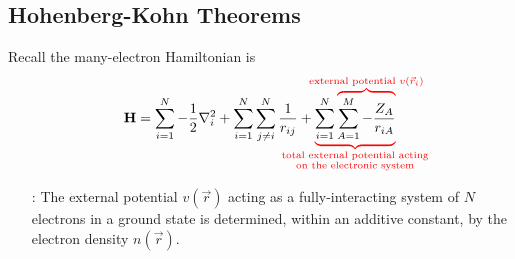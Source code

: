 \documentclass[12pt,a4paper,titlepage]{article}
\newcommand\hruleMod{%
	\vskip12pt
	\nointerlineskip
	{\color{lightgray}\leaders\vrule width \textwidth\vskip0.4pt}
	\nointerlineskip
	\vskip12pt
}
\newcommand{\aside}[3][]{ %
	\ifthenelse{\equal{#1}{}}{\hruleMod}{}
	\begin{itemize}[align=left,labelindent=0em,labelwidth=3em,labelsep*=0.5em,leftmargin=!]
		\item[\ul{#2}:]{#3}
	\end{itemize}
	\ifthenelse{\equal{#1}{}}{\hruleMod}{}
}
\newcommand{\trm}[1]{\textrm{#1}} %
\newcommand{\ul}[1]{\underline{\smash{#1}}} %
\begin{document}
\subsection{Hohenberg-Kohn Theorems}
Recall the many-electron Hamiltonian is
\begin{equation}
\vb{H}=\sum_{i=1}^{N}-\frac{1}{2}\nabla_{i}^{2}+\sum_{i=1}^{N}\sum_{j\neq i}^{N}\frac{1}{r_{ij}}+{\color{red}\underbrace{\color{black}\sum_{i=1}^{N}{\color{red}\overbrace{\color{black}\sum_{A=1}^{M}-\frac{Z_{A}}{r_{iA}}}^{\mathclap{\trm{external potential $v(\vec{r}_{i})$}}}}}_{\mathclap{\substack{\trm{total external potential acting}\\ \trm{on the electronic system}}}}}
\end{equation}
\aside[0]{Theorem 1}{The external potential $v(\vec{r})$ acting as a fully-interacting system of $N$ electrons in a ground state is determined, within an additive constant, by the electron density $n(\vec{r})$.
}
\newpage
\end{document}
